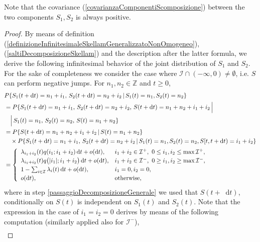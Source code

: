 \documentclass[12pt, twoside, english, headsepline]{article}
\newcommand*\dif{\mathop{}\!\mathrm{d}}  %
\theoremstyle{definition} %
\numberwithin{equation}{section} %
\begin{document}
Note that the covariance (\ref{covarianzaComponentiScomposizione}) between the two components $S_1,S_2$ is always positive.

\begin{proof}
	By means of definition (\ref{definizioneInfinitesimaleSkellamGeneralizzatoNonOmogeneo}), (\ref{saltiDecomposizioneSkellam}) and the description after the latter formula, we derive the following infinitesimal behavior of the joint distribution of $S_1$ and $S_2$. For the sake of completeness we consider the case where $\mathcal{I}\cap (-\infty,0)\not=\emptyset$, i.e. $S$ can perform negative jumps. For $n_1,n_2\in\mathbb{Z}$ and $t\ge0$, \begin{align}\label{definizioneInfinitesimaleSkellamGeneralizzatoNonOmogeneoScomposizione}
		&P\{S_1(t+\dif t) = n_1+i_1,\,S_2(t+\dif t) = n_2+i_2\,|\,S_1(t) = n_1, S_2(t) = n_2\}  \\
		& = P\{S_1(t+\dif t) = n_1+i_1,\,S_2(t+\dif t) = n_2+i_2,\, S(t+\dif t) = n_1+n_2+i_1+i_2\, \Big | \nonumber\\
		&\ \ \ \Big| \,S_1(t) = n_1,\,S_2(t) = n_2,\, S(t) = n_1+n_2\}\nonumber\\
		& = P\{S(t+\dif t) = n_1+n_2+i_1+i_2 \,|\,S(t) = n_1+n_2\}\label{passaggioDecomposizioneGenerale}\\
		&\ \ \ \times P\{S_1(t+\dif t) = n_1+i_1,\,S_2(t+\dif t) = n_2+i_2\,|\,S_1(t) = n_1,S_2(t) = n_2,S[t,t+\dif t) = i_1+i_2\}\nonumber\\
		&= \begin{cases}
			\begin{array}{l l}
				\lambda_{i_1+i_2}(t)q(i_1;i_1+i_2)\dif t + o(\dif t), & i_1+i_2\in \mathcal{I}^+,\ 0\le i_1,i_2\le \max\mathcal{I}^+,\\
				\lambda_{i_1+i_2}(t)q\big(|i_1|;i_1+i_2\big)\dif t + o(\dif t), & i_1+i_2\in \mathcal{I}^-,\ 0\ge i_1,i_2\ge \max\mathcal{I}^-,\\
				1-\sum_{i\in\mathcal{I}} \lambda_i(t)\dif t + o(\dif t), & i_1=0, i_2=0,\\
				o(\dif t), & \text{otherwise},
			\end{array}
		\end{cases}\nonumber
	\end{align}
	where in step \eqref{passaggioDecomposizioneGenerale} we used that $S(t+\dif t)$, conditionally on $S(t)$ is independent on $S_1(t)$ and $S_2(t)$.
	Note that the expression in the case of $i_1=i_2 = 0$ derives by means of the following computation (similarly applied also for $\mathcal{I}^-$),
	\begin{align*}

\end{align*}
\end{proof}
\end{document}

